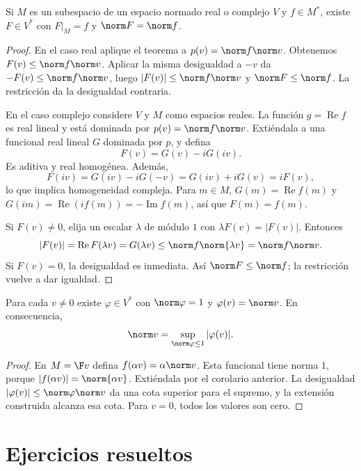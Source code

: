 \begin{corolario}\label{ch21:hb-norma}
Si $M$ es un subespacio de un espacio normado real o complejo $V$ y $f\in M^*$, existe $F\in V^*$ con $F|_M=f$ y $\norm F=\norm f$.
\end{corolario}
\begin{proof}
En el caso real aplique el teorema a $p(v)=\norm f\norm v$. Obtenemos $F(v)\leq\norm f\norm v$. Aplicar la misma desigualdad a $-v$ da $-F(v)\leq\norm f\norm v$, luego $|F(v)|\leq\norm f\norm v$ y $\norm F\leq\norm f$. La restricción da la desigualdad contraria.

En el caso complejo considere $V$ y $M$ como espacios reales. La función $g=\operatorname{Re}f$ es real lineal y está dominada por $p(v)=\norm f\norm v$. Extiéndala a una funcional real lineal $G$ dominada por $p$, y defina
\[
 F(v)=G(v)-iG(iv).
\]
Es aditiva y real homogénea. Además,
\[
 F(iv)=G(iv)-iG(-v)=G(iv)+iG(v)=iF(v),
\]
lo que implica homogeneidad compleja. Para $m\in M$, $G(m)=\operatorname{Re}f(m)$ y $G(im)=\operatorname{Re}(if(m))=-\operatorname{Im}f(m)$, así que $F(m)=f(m)$.

Si $F(v)\ne0$, elija un escalar $\lambda$ de módulo $1$ con $\lambda F(v)=|F(v)|$. Entonces
\[
 |F(v)|=\operatorname{Re}F(\lambda v)=G(\lambda v)
 \leq\norm f\norm{\lambda v}=\norm f\norm v.
\]
Si $F(v)=0$, la desigualdad es inmediata. Así $\norm F\leq\norm f$; la restricción vuelve a dar igualdad.
\end{proof}

\begin{corolario}\label{ch21:funcional-normante}
Para cada $v\ne0$ existe $\varphi\in V^*$ con $\norm\varphi=1$ y $\varphi(v)=\norm v$. En consecuencia,
\[\norm v=\sup_{\norm\varphi\leq1}|\varphi(v)|.\]
\end{corolario}
\begin{proof}
En $M=\F v$ defina $f(\alpha v)=\alpha\norm v$. Esta funcional tiene norma $1$, porque $|f(\alpha v)|=\norm{\alpha v}$. Extiéndala por el corolario anterior. La desigualdad $|\varphi(v)|\leq\norm\varphi\norm v$ da una cota superior para el supremo, y la extensión construida alcanza esa cota. Para $v=0$, todos los valores son cero.
\end{proof}

\section{Ejercicios resueltos}

